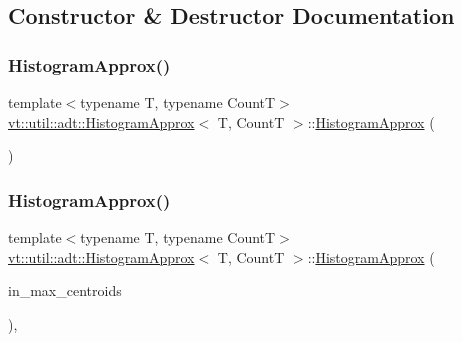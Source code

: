 \subsection{Constructor \& Destructor Documentation}
\mbox{\label{structvt_1_1util_1_1adt_1_1_histogram_approx_accb60fd3c6827b4bc3f8db9d688397b3}} 
\subsubsection{\texorpdfstring{Histogram\+Approx()}{HistogramApprox()}\hspace{0.1cm}{\footnotesize\ttfamily [1/2]}}
{\footnotesize\ttfamily template$<$typename T, typename CountT$>$ \\
\hyperlink{structvt_1_1util_1_1adt_1_1_histogram_approx}{vt\+::util\+::adt\+::\+Histogram\+Approx}$<$ T, CountT $>$\+::\hyperlink{structvt_1_1util_1_1adt_1_1_histogram_approx}{Histogram\+Approx} (\begin{DoxyParamCaption}{ }\end{DoxyParamCaption})\hspace{0.3cm}{\ttfamily [default]}}

\mbox{\label{structvt_1_1util_1_1adt_1_1_histogram_approx_a3b78cb4504ac095d913cefe1db3b442a}} 
\subsubsection{\texorpdfstring{Histogram\+Approx()}{HistogramApprox()}\hspace{0.1cm}{\footnotesize\ttfamily [2/2]}}
{\footnotesize\ttfamily template$<$typename T, typename CountT$>$ \\
\hyperlink{structvt_1_1util_1_1adt_1_1_histogram_approx}{vt\+::util\+::adt\+::\+Histogram\+Approx}$<$ T, CountT $>$\+::\hyperlink{structvt_1_1util_1_1adt_1_1_histogram_approx}{Histogram\+Approx} (\begin{DoxyParamCaption}\item[{\hyperlink{structvt_1_1util_1_1adt_1_1_histogram_approx_aa2fb74665588d311da76dd821f2912c6}{Count\+Type}}]{in\+\_\+max\+\_\+centroids }\end{DoxyParamCaption})\hspace{0.3cm}{\ttfamily [inline]}, {\ttfamily [explicit]}}



